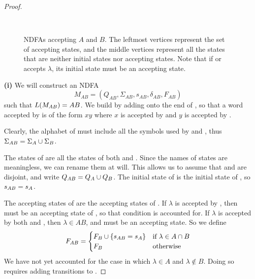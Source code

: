 \documentclass{bcthesis}
\begin{document}
\begin{proof}
		\begin{figure}[H]
			\centering
			\\
			\caption{
				NDFAs accepting $A$ and $B$.
				The leftmost vertices represent the set of accepting states, and the middle vertices represent all the states that are neither initial states nor accepting states.
				Note that if \ma or \mb accepts $\lambda$, its initial state must be an accepting state.
			}
			\label{fig:ma_and_mb}
		\end{figure}

		\noindent \textbf{(i)} \hspace{\parindent}
		We will construct an NDFA 
		\[
			M_{AB} = (Q_{AB}, \Sigma_{AB}, s_{AB}, \delta_{AB}, F_{AB})
		\]
		such that $L(M_{AB}) = AB$.
		We build \mab by adding \mb onto the end of \ma, so that a word accepted by \mab is of the form $xy$ where $x$ is accepted by \ma and $y$ is accepted by \mb.

		Clearly, the alphabet of \mab must include all the symbols used by \ma and \mb, thus $\Sigma_{AB} = \Sigma_A \cup \Sigma_B$.
		
		The states of \mab are all the states of both \ma and \mb.
		Since the names of states are meaningless, we can rename them at will. 
		This allows us to assume that \qa and \qb are disjoint, and write $Q_{AB} = Q_A \cup Q_B$.
		The initial state of \mab is the initial state of \ma, so $s_{AB} = s_A$.

		The accepting states of \mab are the accepting states of \mb.
		If $\lambda$ is accepted by \mb, then \sb must be an accepting state of \mb, so that condition is accounted for.
		If $\lambda$ is accepted by both \ma and \mb, then $\lambda \in AB$, and \sab must be an accepting state.
		So we define
		\[
			F_{AB} = 	\begin{cases}
						F_B \cup \{ s_{AB} = s_A \} &\text{if } \lambda \in A \cap B \\
						F_B &\text{otherwise}
					\end{cases}
		\]
		We have not yet accounted for the case in which $\lambda \in A$ and $\lambda \notin B$.
		Doing so requires adding transitions to \mab.


\end{proof}
\end{document}

